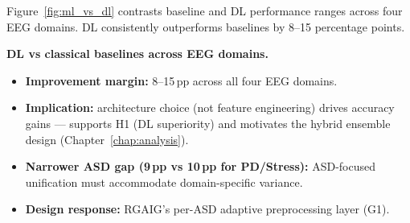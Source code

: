 Figure~\ref{fig:ml_vs_dl} contrasts baseline and DL performance ranges across four EEG domains. DL consistently outperforms baselines by 8--15 percentage points.

%

\noindent\textbf{DL vs classical baselines across EEG domains.}
\begin{itemize}[leftmargin=*, itemsep=2pt]
    \item \textbf{Improvement margin:} 8--15\,pp across all four EEG domains.
    \item \textbf{Implication:} architecture choice (not feature engineering) drives accuracy gains --- supports H1 (DL superiority) and motivates the hybrid ensemble design (Chapter~\ref{chap:analysis}).
    \item \textbf{Narrower ASD gap (9\,pp vs 10\,pp for PD/Stress):} ASD-focused unification must accommodate domain-specific variance.
    \item \textbf{Design response:} RGAIG's per-ASD adaptive preprocessing layer (G1).
\end{itemize}

